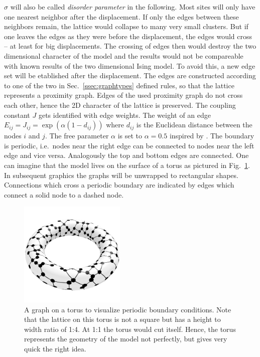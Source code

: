     \(\sigma\) will also be called \emph{disorder parameter} in the following.
    Most sites will only have one nearest neighbor after the
    displacement. If only the edges between these neighbors remain,
    the lattice would collapse to many very small clusters. But if one
    leaves the edges as they were before the displacement, the edges would
    cross -- at least for big displacements. The crossing of edges then
    would destroy the two dimensional character of the model and the results
    would not be compareable with known results of the two dimensional
    Ising model.
    To avoid this, a new edge set will be etablished after the displacement.
    The edges are constructed according to
    one of the two in Sec.\ \ref{ssec:graphtypes} defined rules,
    so that the lattice represents a proximity graph. Edges
    of the used proximity graph do not cross each other, hence the 2D
    character of the lattice is preserved. The coupling constant \(J\) gets
    identified with edge weights. The weight of an edge \(E_{ij} =
    J_{ij} = \exp (\alpha (1-d_{ij}))\) where \(d_{ij}\) is the Euclidean
    distance between the nodes \(i\) and \(j\). The free parameter
    \(\alpha\) is set to \(\alpha = 0.5\) inspired by \cite{Lima2000}.
    The boundary is periodic, i.e.\ nodes near the right edge can be
    connected to nodes near the left edge and vice versa. Analogously the
    top and bottom edges are connected. One can imagine that the model
    lives on the surface of a torus as pictured in Fig.\ \ref{fig:torusRNG}.
    In subsequent graphics the graphs will be unwrapped to rectangular
    shapes. Connections which cross a periodic boundary are indicated
    by edges which connect a solid node to a dashed node.
    \begin{figure}[htbp]
        \centering
        \includegraphics[width=0.45\textwidth]{images/torus}
        \caption[A Graph on a Torus to Visualise Periodic Boundary Conditions]
        {
            A graph on a torus to visualize periodic boundary conditions.
            Note that the lattice on this torus is not a square but has
            a height to width ratio of 1:4. At 1:1 the torus would cut
            itself. Hence, the torus represents the geometry of the model
            not perfectly, but gives very quick the right idea.
        }
        \label{fig:torusRNG}
    \end{figure}\\
